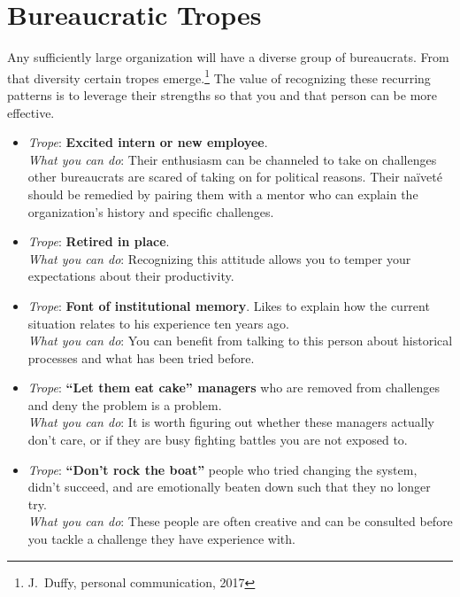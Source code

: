 \section{Bureaucratic Tropes\label{sec:tropes}}

Any sufficiently large organization will have a diverse group of bureaucrats. From that diversity certain tropes emerge.\footnote{J.~Duffy, personal communication, 2017} The value of recognizing these recurring patterns is to leverage their strengths so that you and that person can be more effective. 


\begin{itemize}
    \item \textit{Trope}: \textbf{Excited intern or new employee}. \\
    \textit{What you can do}: Their enthusiasm can be channeled to take on challenges other bureaucrats are scared of taking on for political reasons. Their na\"ivet\'e 
    should be remedied by pairing them with a mentor who can explain the organization's history and specific challenges.
    
    \item \textit{Trope}: \textbf{Retired in place}. \\
    \textit{What you can do}: Recognizing this attitude allows you to temper your expectations about their productivity. 
    
    \item \textit{Trope}: \textbf{Font of institutional memory}. Likes to explain how the current situation relates to his experience ten years ago. \\
    \textit{What you can do}: You can benefit from talking to this person about historical processes and what has been tried before. 
    
    \item \textit{Trope}: \textbf{``Let them eat cake'' managers} who are removed from challenges and deny the problem is a problem. \\
    \textit{What you can do}: It is worth figuring out whether these managers actually don't care, or if they are busy fighting battles you are not exposed to.
    
    \item \textit{Trope}: \textbf{``Don't rock the boat''} people who tried changing the system, didn't succeed, and are emotionally beaten down such that they no longer try. \\
    \textit{What you can do}: These people are often creative and can be consulted before you tackle a challenge they have experience with. 
    

\end{itemize}
